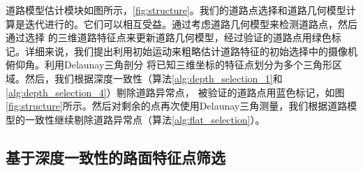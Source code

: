 道路模型估计模块如图所示，\ref{fig:structure}。我们的道路点选择和道路几何模型计算是迭代进行的。它们可以相互受益。通过考虑道路几何模型来检测道路点，然后通过选择
的三维道路特征点来更新道路几何模型，经过验证的道路点用绿色标记。详细来说，我们提出利用初始运动来粗略估计道路特征的初始选择中的摄像机俯仰角。利用Delaunay三角剖分\cite{Shewchuk1996Triangle}
将已知三维坐标的特征点划分为多个三角形区域。然后，我们根据深度一致性（算法\ref{alg:depth_selection_1}和\ref{alg:depth_selection_4}）剔除道路异常点，
被验证的道路点用蓝色标记，如图\ref{fig:structure}所示。然后对剩余的点再次使用Delaunay三角测量，我们根据道路模型的一致性继续剔除道路异常点（算法\ref{alg:flat_selection}）。
\subsection{基于深度一致性的路面特征点筛选}
\label{sec:depth}
